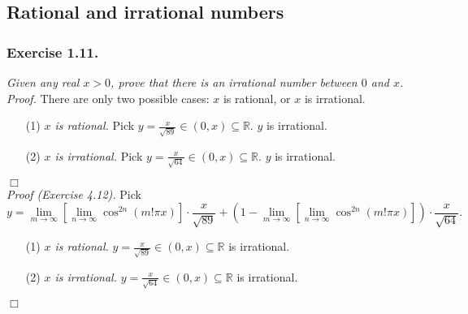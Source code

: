 \documentclass{article}
\begin{document}



\subsection*{Rational and irrational numbers \\}



\subsubsection*{Exercise 1.11.}
\emph{Given any real $x > 0$,
prove that there is an irrational number between $0$ and $x$.} \\



\emph{Proof.}
There are only two possible cases: $x$ is rational, or $x$ is irrational.
\begin{enumerate}
\item[(1)]
\emph{$x$ is rational.}
Pick $y = \frac{x}{\sqrt{89}} \in (0, x) \subseteq \mathbb{R}$. $y$ is irrational.
\item[(2)]
\emph{$x$ is irrational.}
Pick $y = \frac{x}{\sqrt{64}} \in (0, x) \subseteq \mathbb{R}$. $y$ is irrational.
\end{enumerate}
$\Box$ \\

\emph{Proof (Exercise 4.12).}
Pick
$$y
= \lim_{m \rightarrow \infty}[\lim_{n \rightarrow \infty} \cos^{2n}(m!\pi x)]
\cdot \frac{x}{\sqrt{89}}
+
(1 - \lim_{m \rightarrow \infty}[\lim_{n \rightarrow \infty} \cos^{2n}(m!\pi x)])
\cdot \frac{x}{\sqrt{64}}.$$
\begin{enumerate}
\item[(1)]
\emph{$x$ is rational.}
$y = \frac{x}{\sqrt{89}} \in (0, x) \subseteq \mathbb{R}$ is irrational.
\item[(2)]
\emph{$x$ is irrational.}
$y = \frac{x}{\sqrt{64}} \in (0, x) \subseteq \mathbb{R}$ is irrational.
\end{enumerate}
$\Box$ \\\\



\end{document}
